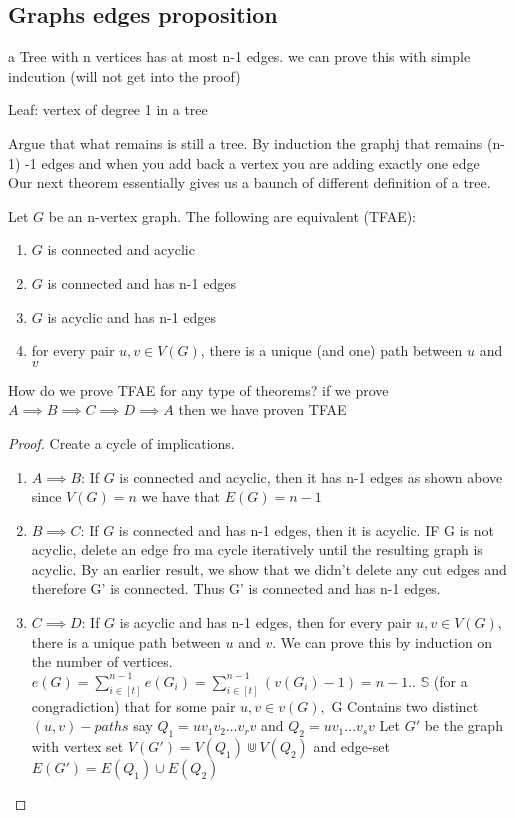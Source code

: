 \documentclass{article}
\begin{document}
\subsection{Graphs edges proposition}
a Tree with n vertices has at most n-1 edges. we can prove this with simple indcution (will not get into the proof) 
\begin{definition}
    Leaf: vertex of degree 1 in a tree

\end{definition}
Argue that what remains is still a tree. By induction the graphj that remains (n-1) -1 edges and when you add back a vertex you are adding exactly one edge 
\\ 
Our next theorem essentially gives us a baunch of different definition of a tree.
\begin{theorem}
    Let $G$ be an n-vertex graph. The following are equivalent (TFAE): 
    \begin{enumerate}
        \item $G$ is connected and acyclic 
        \item $G$ is connected and has n-1 edges
        \item $G$ is acyclic and has n-1 edges
        \item for every pair $u, v \in V(G)$, there is a unique (and one) path between $u$ and $v$
    \end{enumerate}
    How do we prove TFAE for any type of theorems? if we prove $A \implies B \implies C \implies D \implies A$ then we have proven TFAE
    \begin{proof}
        Create a cycle of implications. 
        \begin{enumerate}
            \item $A \implies B$: If $G$ is connected and acyclic, then it has n-1 edges as shown above since $V(G) = n$ we have that $E(G) = n-1$
            \item $B \implies C$: If $G$ is connected and has n-1 edges, then it is acyclic. IF G is not acyclic, delete an edge fro ma cycle iteratively until the resulting graph is acyclic. By an earlier result, we show that we didn't delete any cut edges and therefore G' is connected. Thus G' is connected and has n-1 edges.
            \item $C \implies D$: If $G$ is acyclic and has n-1 edges, then for every pair $u, v \in V(G)$, there is a unique path between $u$ and $v$. We can prove this by induction on the number of vertices. \\ $e(G) = \sum_{i \in [t]}^{n-1} e(G_i) = \sum_{i \in [t]}^{n-1} (v(G_i) - 1) = n-1$.. $\mathbb{S} $ (for a congradiction) that for some pair $u, v \in v(G), $ G Contains two distinct $(u, v) - paths$ say $Q_1 = uv_1 v_2 \dots v_r v$ and $Q_2 = uv_1 \dots v_s v$ Let $G'$ be the graph with vertex set $V(G' )= V(Q_1) \Cup V(Q_2)$ and edge-set $E(G') = E(Q_1) \cup E(Q_2)$  

\end{enumerate}
\end{proof}
\end{theorem}
\end{document}
